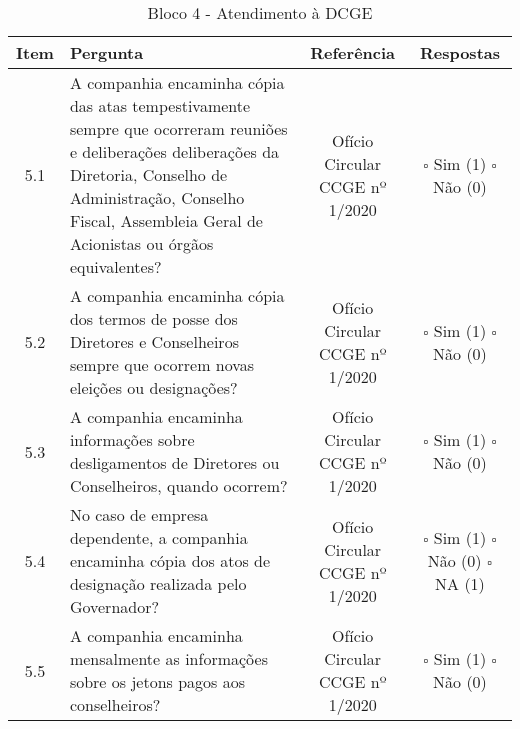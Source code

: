\begin{center}
\begin{longtable}{c l c c}
\caption{Bloco 4 - Atendimento à DCGE} \label{tab:bloco3} \\
\hline
 Item & Pergunta & Referência & Respostas \\ 
 \hline
5.1 &\parbox[t]{8cm}{A companhia encaminha cópia das atas tempestivamente sempre que ocorreram reuniões e deliberações deliberações da Diretoria, Conselho de Administração, Conselho Fiscal, Assembleia Geral de Acionistas ou órgãos equivalentes?} & \parbox[t]{2cm}{Ofício Circular CCGE nº 1/2020} & \parbox[t]{2cm}{$\square$ Sim (1) \\ $\square$ Não (0)}\\

5.2 &\parbox[t]{8cm}{A companhia encaminha cópia dos termos de posse dos Diretores e Conselheiros sempre que ocorrem novas eleições ou designações?} & \parbox[t]{2cm}{Ofício Circular CCGE nº 1/2020} & \parbox[t]{2cm}{$\square$ Sim (1) \\ $\square$ Não (0)}\\

5.3 &\parbox[t]{8cm}{A companhia encaminha informações sobre desligamentos de Diretores ou Conselheiros, quando ocorrem?} & \parbox[t]{2cm}{Ofício Circular CCGE nº 1/2020} & \parbox[t]{2cm}{$\square$ Sim (1) \\ $\square$ Não (0)}\\

5.4 &\parbox[t]{8cm}{No caso de empresa dependente, a companhia encaminha cópia dos atos de designação realizada pelo Governador?} & \parbox[t]{2cm}{Ofício Circular CCGE nº 1/2020} & \parbox[t]{2cm}{$\square$ Sim (1) \\ $\square$ Não (0) \\ $\square$ NA (1)} \\

5.5 &\parbox[t]{8cm}{A companhia encaminha mensalmente  as informações sobre os jetons pagos aos conselheiros?} & \parbox[t]{2cm}{Ofício Circular CCGE nº 1/2020} & \parbox[t]{2cm}{$\square$ Sim (1) \\ $\square$ Não (0)}\\

\end{longtable}
\end{center}